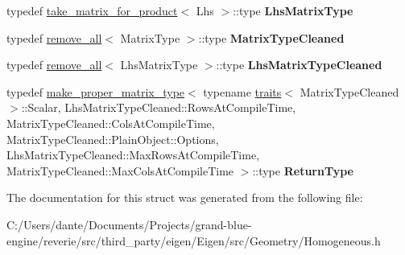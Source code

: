 \begin{DoxyCompactItemize}
\item 
\mbox{\label{struct_eigen_1_1internal_1_1traits_3_01homogeneous__left__product__impl_3_01_homogeneous_3_01_ma5f6080eece96c58f7d2ccea57ec7242b_a595c32d9896fc2f15a47df3abd723427}} 
typedef \mbox{\hyperlink{struct_eigen_1_1internal_1_1take__matrix__for__product}{take\+\_\+matrix\+\_\+for\+\_\+product}}$<$ Lhs $>$\+::type {\bfseries Lhs\+Matrix\+Type}
\item 
\mbox{\label{struct_eigen_1_1internal_1_1traits_3_01homogeneous__left__product__impl_3_01_homogeneous_3_01_ma5f6080eece96c58f7d2ccea57ec7242b_a44842fe354bb9881d2a2eaa09d33b6df}} 
typedef \mbox{\hyperlink{struct_eigen_1_1internal_1_1remove__all}{remove\+\_\+all}}$<$ Matrix\+Type $>$\+::type {\bfseries Matrix\+Type\+Cleaned}
\item 
\mbox{\label{struct_eigen_1_1internal_1_1traits_3_01homogeneous__left__product__impl_3_01_homogeneous_3_01_ma5f6080eece96c58f7d2ccea57ec7242b_a43d1b178bc4d950cb11352deab9fda12}} 
typedef \mbox{\hyperlink{struct_eigen_1_1internal_1_1remove__all}{remove\+\_\+all}}$<$ Lhs\+Matrix\+Type $>$\+::type {\bfseries Lhs\+Matrix\+Type\+Cleaned}
\item 
\mbox{\label{struct_eigen_1_1internal_1_1traits_3_01homogeneous__left__product__impl_3_01_homogeneous_3_01_ma5f6080eece96c58f7d2ccea57ec7242b_ac715b005ae93d6769c5c2d41ffa3f18b}} 
typedef \mbox{\hyperlink{class_eigen_1_1internal_1_1make__proper__matrix__type}{make\+\_\+proper\+\_\+matrix\+\_\+type}}$<$ typename \mbox{\hyperlink{struct_eigen_1_1internal_1_1traits}{traits}}$<$ Matrix\+Type\+Cleaned $>$\+::Scalar, Lhs\+Matrix\+Type\+Cleaned\+::\+Rows\+At\+Compile\+Time, Matrix\+Type\+Cleaned\+::\+Cols\+At\+Compile\+Time, Matrix\+Type\+Cleaned\+::\+Plain\+Object\+::\+Options, Lhs\+Matrix\+Type\+Cleaned\+::\+Max\+Rows\+At\+Compile\+Time, Matrix\+Type\+Cleaned\+::\+Max\+Cols\+At\+Compile\+Time $>$\+::type {\bfseries Return\+Type}
\end{DoxyCompactItemize}


The documentation for this struct was generated from the following file\+:\begin{DoxyCompactItemize}
\item 
C\+:/\+Users/dante/\+Documents/\+Projects/grand-\/blue-\/engine/reverie/src/third\+\_\+party/eigen/\+Eigen/src/\+Geometry/Homogeneous.\+h\end{DoxyCompactItemize}
